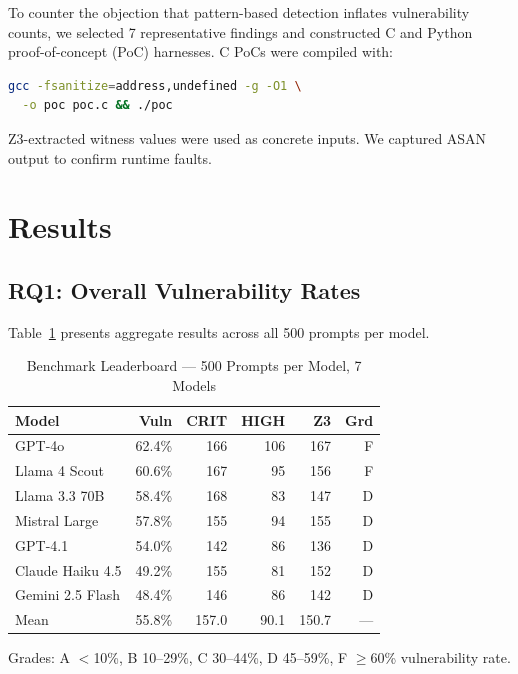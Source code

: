 \documentclass[10pt,twocolumn]{article}
\begin{document}
To counter the objection that pattern-based detection inflates
vulnerability counts, we selected 7 representative findings and
constructed C and Python proof-of-concept (PoC) harnesses. C PoCs were
compiled with:

\begin{lstlisting}[language=bash]
gcc -fsanitize=address,undefined -g -O1 \
  -o poc poc.c && ./poc
\end{lstlisting}

Z3-extracted witness values were used as concrete inputs. We captured
ASAN output to confirm runtime faults.

\section{Results}

\subsection{RQ1: Overall Vulnerability Rates}

Table~\ref{tab:leaderboard} presents aggregate results across all 500
prompts per model.

\begin{table}[h]
\centering
\caption{Benchmark Leaderboard --- 500 Prompts per Model, 7 Models}
\label{tab:leaderboard}
\begin{tabular}{lrrrrr}
\toprule
\textbf{Model} & \textbf{Vuln} & \textbf{CRIT} & \textbf{HIGH} &
\textbf{Z3} & \textbf{Grd} \\
\midrule
GPT-4o           & 62.4\% & 166 & 106 & 167 & F \\
Llama 4 Scout    & 60.6\% & 167 & 95  & 156 & F \\
Llama 3.3 70B    & 58.4\% & 168 & 83  & 147 & D \\
Mistral Large    & 57.8\% & 155 & 94  & 155 & D \\
GPT-4.1          & 54.0\% & 142 & 86  & 136 & D \\
Claude Haiku 4.5 & 49.2\% & 155 & 81  & 152 & D \\
Gemini 2.5 Flash & 48.4\% & 146 & 86  & 142 & D \\
\midrule
Mean & 55.8\% & 157.0 & 90.1 & 150.7 & --- \\
\bottomrule
\end{tabular}

\smallskip
{\normalfont\footnotesize Grades: A $<$10\%, B 10--29\%, C 30--44\%, D 45--59\%, F $\geq$60\% vulnerability rate.}
\end{table}
\end{document}
